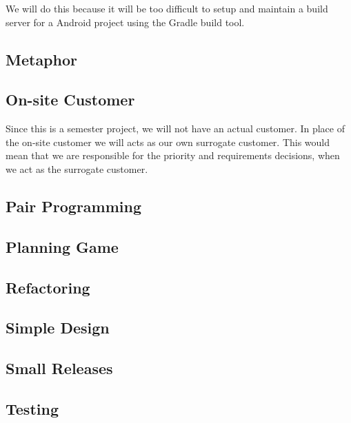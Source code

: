 We will do this because it will be too difficult to setup and maintain a build server for a Android project using the Gradle build tool. 

\subsection{Metaphor}


\subsection{On-site Customer}
Since this is a semester project, we will not have an actual customer.
In place of the on-site customer we will acts as our own surrogate customer.
This would mean that we are responsible for the priority and requirements decisions, when we act as the surrogate customer.

\subsection{Pair Programming}


\subsection{Planning Game}


\subsection{Refactoring}


\subsection{Simple Design}


\subsection{Small Releases}


\subsection{Testing}

